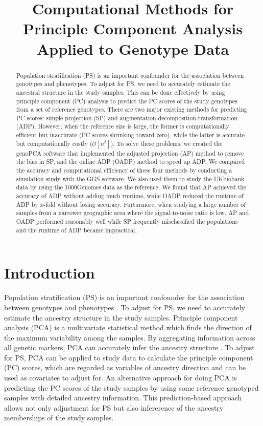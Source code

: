 \documentclass{article}
\title{Computational Methods for Principle Component Analysis Applied to
  Genotype Data}
\date{}
\newcommand{\bO}{\mathcal{O}}
\begin{document}
\maketitle

\begin{abstract}
    Population stratification (PS) is an important confounder
    for the association between genotypes and phenotypes.
    To adjust for PS,
    we need to accurately estimate the ancestral structure
    in the study samples.
    This can be done effectively
    by using principle component (PC) analysis
    to predict the PC scores of the study genotypes
    from a set of reference genotypes.
    There are two major existing methods for predicting PC scores:
    simple projection (SP) and augmentation-decomposition-transformation (ADP).
    However, when the reference size is large,
    the former is computationally efficient but inaccurate
    (PC scores shrinking toward zero),
    while the latter is accurate but computationally costly ($\bO[n^3]$).
    To solve these problems,
    we created the genoPCA software
    that implemented 
    the adjusted projection (AP) method to remove the bias in SP, and
    the online ADP (OADP) method to speed up ADP.
    We compared the accuracy and computational efficiency of these four methods
    by conducting a simulation study
    with the GGS software.
    We also used them to study the UKbiobank data by using the 1000Genomes data as the reference.
    We found that AP achieved the accuracy of ADP without adding much runtime,
    while OADP reduced the runtime of ADP by $x$-fold without losing accuracy.
    Furturmore, when studying a large number of samples
    from a narrower geographic area
    where the signal-to-noise ratio is low,
    AP and OADP performed reasonably well
    while SP frequently misclassified the populations
    and the runtime of ADP became impractical.
    
    
    
    
\end{abstract}

\section{Introduction}

Population stratification (PS) is an important confounder for the association between
genotypes and phenotypes \citep{price2006principal}.
To adjust for PS, we need to accurately estimate the ancestry structure in the study samples.
Principle component analysis (PCA) is a multivariate statistical method
which finds the direction of the maximum variability among the samples.
By aggregating information across all genetic markers,
PCA can accurately infer the ancestry structure \citep{reich2008principal}.
To adjust for PS,
PCA can be applied to study data to calculate the principle component (PC) scores,
which are regarded as variables of ancestry direction
and can be used as covariates to adjust for.
An alternative approach for doing PCA is
predicting the PC scores of the study samples
by using some reference genotyped samples with detailed ancestry information.
This prediction-based approach allows not only adjustment for PS
but also infererence of the ancestry memberships of the study samples. 
\end{document}
